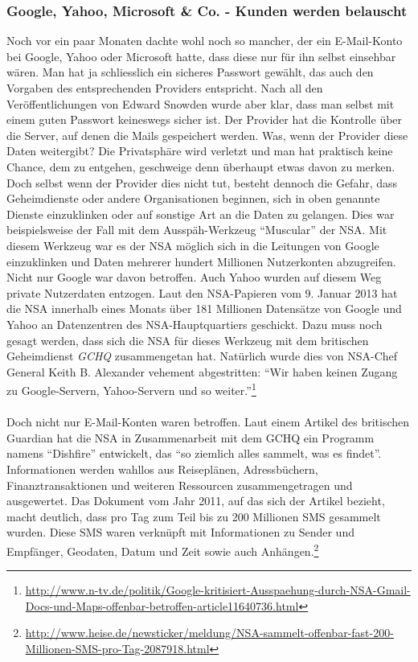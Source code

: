 \subsubsection{Google, Yahoo, Microsoft \& Co. - Kunden werden belauscht}
Noch vor ein paar Monaten dachte wohl noch so mancher, der ein E-Mail-Konto bei Google, Yahoo oder Microsoft hatte, dass diese nur für ihn selbst einsehbar wären. Man hat ja schliesslich ein sicheres Passwort gewählt, das auch den Vorgaben des entsprechenden Providers entspricht. Nach all den Veröffentlichungen von Edward Snowden wurde aber klar, dass man selbst mit einem guten Passwort keineswegs sicher ist. Der Provider hat die Kontrolle über die Server, auf denen die Mails gespeichert werden. Was, wenn der Provider diese Daten weitergibt? Die Privatsphäre wird verletzt und man hat praktisch keine Chance, dem zu entgehen, geschweige denn überhaupt etwas davon zu merken.
Doch selbst wenn der Provider dies nicht tut, besteht dennoch die Gefahr, dass Geheimdienste oder andere Organisationen beginnen, sich in oben genannte Dienste einzuklinken oder auf sonstige Art an die Daten zu gelangen.
Dies war beispielsweise der Fall mit dem Ausspäh-Werkzeug ``Muscular'' der NSA. Mit diesem Werkzeug war es der NSA möglich sich in die Leitungen von Google einzuklinken und Daten mehrerer hundert Millionen Nutzerkonten abzugreifen. Nicht nur Google war davon betroffen. Auch Yahoo wurden auf diesem Weg private Nutzerdaten entzogen. Laut den NSA-Papieren vom 9. Januar 2013 hat die NSA innerhalb eines Monats über 181 Millionen Datensätze von Google und Yahoo an Datenzentren des NSA-Hauptquartiers geschickt. Dazu muss noch gesagt werden, dass sich die NSA für dieses Werkzeug mit dem britischen Geheimdienst \textit{GCHQ} zusammengetan hat.
Natürlich wurde dies von NSA-Chef General Keith B. Alexander vehement abgestritten: ``Wir haben keinen Zugang zu Google-Servern, Yahoo-Servern und so weiter.''\footnote{\url{http://www.n-tv.de/politik/Google-kritisiert-Ausspaehung-durch-NSA-Gmail-Docs-und-Maps-offenbar-betroffen-article11640736.html}}
\\
\\
Doch nicht nur E-Mail-Konten waren betroffen. Laut einem Artikel des britischen Guardian hat die NSA in Zusammenarbeit mit dem GCHQ ein Programm namens ``Dishfire'' entwickelt, das ``so ziemlich alles sammelt, was es findet''.
Informationen werden wahllos aus Reiseplänen, Adressbüchern, Finanztransaktionen und weiteren Ressourcen zusammengetragen und ausgewertet. Das Dokument vom Jahr 2011, auf das sich der Artikel bezieht, macht deutlich, dass pro Tag zum Teil bis zu 200 Millionen SMS gesammelt wurden. Diese SMS waren verknüpft mit Informationen zu Sender und Empfänger, Geodaten, Datum und Zeit sowie auch Anhängen.\footnote{\url{http://www.heise.de/newsticker/meldung/NSA-sammelt-offenbar-fast-200-Millionen-SMS-pro-Tag-2087918.html}}

